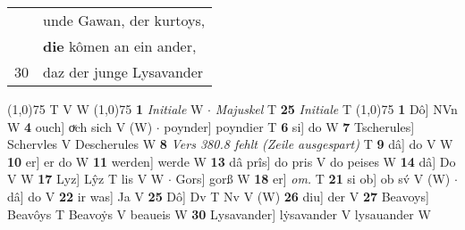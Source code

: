 \documentclass[8pt,a4paper,notitlepage]{article}
\begin{document}
\begin{table}[ht]
\begin{minipage}[t]{0.5\linewidth}
\begin{tabular}{rl}
 & unde Gawan, der kurtoys,\\ 
 & \textbf{die} kômen an ein ander,\\ 
30 & daz der junge Lysavander\\ 
\end{tabular}
\scriptsize
\line(1,0){75} \newline
T V W \newline
\line(1,0){75} \newline
\textbf{1} \textit{Initiale} W   $\cdot$ \textit{Majuskel} T  \textbf{25} \textit{Initiale} T  \newline
\line(1,0){75} \newline
\textbf{1} Dô] NVn W \textbf{4} ouch] oͮch sich V (W)  $\cdot$ poynder] poyndier T \textbf{6} si] do W \textbf{7} Tscherules] Schervles V Descherules W \textbf{8} \textit{Vers 380.8 fehlt (Zeile ausgespart)} T  \textbf{9} dâ] do V W \textbf{10} er] er do W \textbf{11} werden] werde W \textbf{13} dâ prîs] do pris V do peises W \textbf{14} dâ] Do V W \textbf{17} Lyz] Lŷz T lis V W  $\cdot$ Gors] gorß W \textbf{18} er] \textit{om.} T \textbf{21} si ob] ob sv́ V (W)  $\cdot$ dâ] do V \textbf{22} ir was] Ja V \textbf{25} Dô] Dv T Nv V (W) \textbf{26} diu] der V \textbf{27} Beavoys] Beavôys T Beavoẏs V beaueis W \textbf{30} Lysavander] lẏsavander V lysauander W \newline
\end{minipage}
\end{table}
\end{document}
